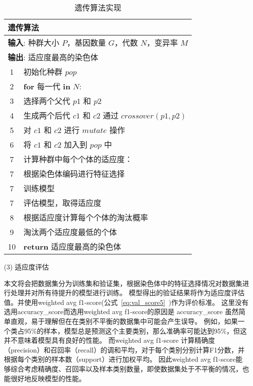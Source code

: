 \begin{table}[htbp]
  \caption{遗传算法实现}
  \label{tab:genetic_algorithm}
  \centering
  \begin{tabularx}{1.0\textwidth}{cl}
  \toprule
  \multicolumn{2}{l}{\textbf{遗传算法}}\\
  \midrule
  \multicolumn{2}{l}{\textbf{输入}: 种群大小 $P$，基因数量 $G$，代数 $N$，变异率 $M$} \\
  \multicolumn{2}{l}{\textbf{输出}: 适应度最高的染色体} \\
  1& 初始化种群 $pop$ \\
  2& \textbf{for} 每一代 \textbf{in} $N$: \\
  3&\quad 选择两个父代 $p1$ 和 $p2$ \\
  4&\quad 生成两个后代 $c1$ 和 $c2$ 通过 $crossover(p1, p2)$ \\
  5&\quad 对 $c1$ 和 $c2$ 进行 $mutate$ 操作 \\
  6&\quad 将 $c1$ 和 $c2$ 加入到 $pop$ 中 \\
  7&\quad 计算种群中每个个体的适应度： \\
  7&\quad\quad\quad\quad 根据染色体编码进行特征选择 \\
  7&\quad\quad\quad\quad 训练模型 \\
  7&\quad\quad\quad\quad 评估模型，取得适应度\\
  8&\quad 根据适应度计算每个个体的淘汰概率 \\
  9&\quad 淘汰两个适应度最低的个体 \\
  10& \textbf{return} 适应度最高的染色体 \\
  \bottomrule
  \end{tabularx}
\end{table}
(3) 适应度评估\par
本文将会把数据集分为训练集和验证集，根据染色体中的特征选择情况对数据集进行处理并对所有待提升的模型进行训练。
模型得出的验证结果将作为适应度评估值。并使用weighted avg f1-score(公式~\ref{eq:val_score5}~)作为评价标准。
这里没有选用accuracy\_score而选用weighted avg f1-score的原因是
accuracy\_score 虽然简单直观，易于理解但在在类别不平衡的数据集中可能会产生误导。
例如，如果一个类占95\%的样本，模型总是预测这个主要类别，那么准确率可能达到95\%，但这并不意味着模型具有良好的性能。
而weighted avg f1-score 计算精确度（precision）和召回率（recall）的调和平均，对于每个类别分别计算F1分数，并根据每个类别的样本数（support）进行加权平均。
因此weighted avg f1-score能够综合考虑精确度、召回率以及样本类别数量，即使数据集处于不平衡的情况，也能很好地反映模型的性能。\par

